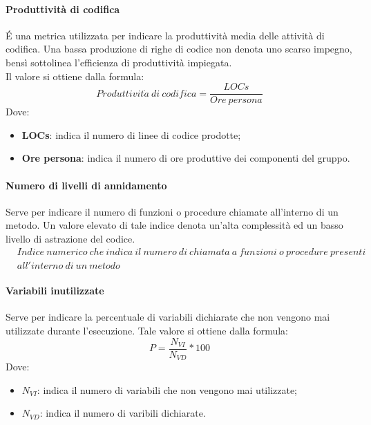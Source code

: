 \documentclass[../PianoDiQualifica.tex]{subfiles}
\begin{document}
			\paragraph{Produttività di codifica}
				É una metrica utilizzata per indicare la produttività media delle attività di codifica. Una bassa produzione di righe di codice non denota uno scarso impegno, bensì sottolinea l'efficienza di produttività impiegata. \\Il valore si ottiene dalla formula:
				\begin{equation*}
					Produttivit\grave{a} \ di \ codifica = \frac{LOCs}{Ore \ persona}
				\end{equation*}
				Dove:
				\begin{itemize}
					\item \textbf{LOCs}: indica il numero di linee di codice prodotte;
					\item \textbf{Ore persona}: indica il numero di ore produttive dei componenti del gruppo.
				\end{itemize}
			
			\paragraph{Numero di livelli di annidamento}
				Serve per indicare il numero di funzioni o procedure chiamate all'interno di un metodo. Un valore elevato di tale indice denota un'alta complessità ed un basso livello di astrazione del codice.
				\begin{equation*}
					\begin{split}
						&Indice \ numerico \ che \ indica \ il \ numero \ di \ chiamata \ a \ funzioni \ o \ procedure \ presenti \\ 								&all'interno \ di \ un \ metodo
					\end{split}
				\end{equation*}
			
			\paragraph{Variabili inutilizzate}
				Serve per indicare la percentuale di variabili dichiarate che non vengono mai utilizzate durante l'esecuzione.
				Tale valore si ottiene dalla formula:
				\begin{equation*}
					P = \frac{N_{VI}}{N_{VD}} * 100
				\end{equation*}
				Dove:
				\begin{itemize}
					\item \textbf{$N_{VI}$}: indica il numero di variabili che non vengono mai utilizzate;
					\item \textbf{$N_{VD}$}: indica il numero di varibili dichiarate.
				\end{itemize}
				
\end{document}
